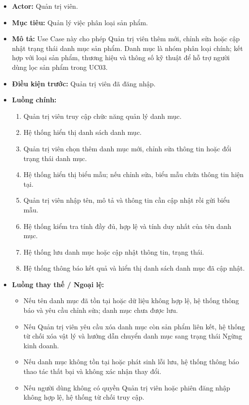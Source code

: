 \documentclass[12pt,a4paper]{article}
\begin{document}
\begin{itemize}

 \item \textbf{Actor:} Quản trị viên.

 \item \textbf{Mục tiêu:} Quản lý việc phân loại sản phẩm.

  \item \textbf{Mô tả:} Use Case này cho phép Quản trị viên thêm mới, chỉnh sửa hoặc cập nhật trạng thái danh mục sản phẩm. Danh mục là nhóm phân loại chính; kết hợp với loại sản phẩm, thương hiệu và thông số kỹ thuật để hỗ trợ người dùng lọc sản phẩm trong UC03.

 \item \textbf{Điều kiện trước:} Quản trị viên đã đăng nhập.

 \item \textbf{Luồng chính:}

 \begin{enumerate}

  \item Quản trị viên truy cập chức năng quản lý danh mục.

  \item Hệ thống hiển thị danh sách danh mục.

   \item Quản trị viên chọn thêm danh mục mới, chỉnh sửa thông tin hoặc đổi trạng thái danh mục.

   \item Hệ thống hiển thị biểu mẫu; nếu chỉnh sửa, biểu mẫu chứa thông tin hiện tại.

   \item Quản trị viên nhập tên, mô tả và thông tin cần cập nhật rồi gửi biểu mẫu.

   \item Hệ thống kiểm tra tính đầy đủ, hợp lệ và tính duy nhất của tên danh mục.

   \item Hệ thống lưu danh mục hoặc cập nhật thông tin, trạng thái.

   \item Hệ thống thông báo kết quả và hiển thị danh sách danh mục đã cập nhật.

 \end{enumerate}

  \item \textbf{Luồng thay thế / Ngoại lệ:}
  \begin{itemize}
  \item Nếu tên danh mục đã tồn tại hoặc dữ liệu không hợp lệ, hệ thống thông báo và yêu cầu chỉnh sửa; danh mục chưa được lưu.
  \item Nếu Quản trị viên yêu cầu xóa danh mục còn sản phẩm liên kết, hệ thống từ chối xóa vật lý và hướng dẫn chuyển danh mục sang trạng thái Ngừng kinh doanh.
  \item Nếu danh mục không tồn tại hoặc phát sinh lỗi lưu, hệ thống thông báo thao tác thất bại và không xác nhận thay đổi.
  \item Nếu người dùng không có quyền Quản trị viên hoặc phiên đăng nhập không hợp lệ, hệ thống từ chối truy cập.
  \end{itemize}


\end{itemize}
\end{document}
